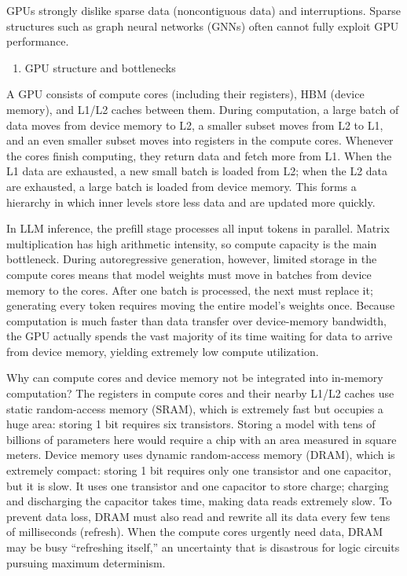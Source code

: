 GPUs strongly dislike sparse data (noncontiguous data) and interruptions. Sparse structures such as graph neural networks (GNNs) often cannot fully exploit GPU performance.

\begin{enumerate}
\def\labelenumi{\arabic{enumi}.}
\setcounter{enumi}{1}
\tightlist
\item
  GPU structure and bottlenecks
\end{enumerate}

A GPU consists of compute cores (including their registers), HBM (device memory), and L1/L2 caches between them. During computation, a large batch of data moves from device memory to L2, a smaller subset moves from L2 to L1, and an even smaller subset moves into registers in the compute cores. Whenever the cores finish computing, they return data and fetch more from L1. When the L1 data are exhausted, a new small batch is loaded from L2; when the L2 data are exhausted, a large batch is loaded from device memory. This forms a hierarchy in which inner levels store less data and are updated more quickly.

In LLM inference, the prefill stage processes all input tokens in parallel. Matrix multiplication has high arithmetic intensity, so compute capacity is the main bottleneck. During autoregressive generation, however, limited storage in the compute cores means that model weights must move in batches from device memory to the cores. After one batch is processed, the next must replace it; generating every token requires moving the entire model's weights once. Because computation is much faster than data transfer over device-memory bandwidth, the GPU actually spends the vast majority of its time waiting for data to arrive from device memory, yielding extremely low compute utilization.

Why can compute cores and device memory not be integrated into in-memory computation? The registers in compute cores and their nearby L1/L2 caches use static random-access memory (SRAM), which is extremely fast but occupies a huge area: storing 1 bit requires six transistors. Storing a model with tens of billions of parameters here would require a chip with an area measured in square meters. Device memory uses dynamic random-access memory (DRAM), which is extremely compact: storing 1 bit requires only one transistor and one capacitor, but it is slow. It uses one transistor and one capacitor to store charge; charging and discharging the capacitor takes time, making data reads extremely slow. To prevent data loss, DRAM must also read and rewrite all its data every few tens of milliseconds (refresh). When the compute cores urgently need data, DRAM may be busy ``refreshing itself,'' an uncertainty that is disastrous for logic circuits pursuing maximum determinism.

